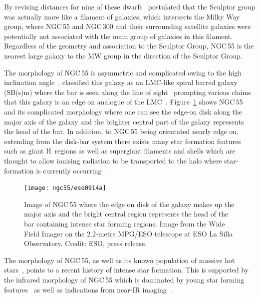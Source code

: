 By revising distances for nine of these dwarfs~\cite{2003A&A...404...93K} postulated that the Sculptor group was actually more like a filament of galaxies, which intersects the Milky Way group, where NGC\,55 and NGC\,300 and their surrounding satellite galaxies were potentially not associated with the main group of galaxies in this filament.
Regardless of the geometry and association to the Sculptor Group, NGC\,55 is the nearest large galaxy to the MW group in the direction of the Sculptor Group.

The morphology of NGC\,55 is asymmetric and complicated owing to the high inclination angle~\cite[up to 80\textdegree;][]{1986A&A...166...97H,2013MNRAS.434.3511W}.
\cite{1961ApJ...133..405D} classified this galaxy as an LMC-like spiral barred galaxy (SB(s)m) where the bar is seen along the line of sight~\cite{1961ApJ...133..405D}
prompting various claims that this galaxy is an edge on analogue of the LMC~\citep[e.g.][although not cited heavily -- two citations in 50 years -- the idea has propagated]{1964IAUS...20..276R}.
Figure~\ref{fig:ngc55-wide} shows NGC\,55 and its complicated morphology where one can see the edge-on disk along the major axis of the galaxy and the brighter central part of the galaxy represents the head of the bar.
In addition, to NGC\,55 being orientated nearly edge on, extending from the disk-bar system there exists many star formation features such as giant H\,\2 regions as well as supergiant filaments and shells which are thought to allow ionising radiation to be transported to the halo where star-formation is currently occurring~\citep{1996AJ....112.2567F}.

\begin{figure}
 \centering
 \texttt{[image: ngc55/eso0914a]}
 \caption[Image of NGC\,55]{Image of NGC\,55 where the edge on disk of the galaxy makes up the major axis and the bright central region represents the head of the bar containing intense star forming regions.
 Image from the Wide Field Imager on the 2.2-metre MPG/ESO telescope at ESO La Silla Observatory. Credit: ESO, press release.}
 \label{fig:ngc55-wide}
\end{figure}


The morphology of NGC\,55, as well as its known population of massive hot stars~\citep{2008A&A...485...41C,2012A&A...542A..79C}, points to a recent history of intense star formation.
This is supported by the infrared morphology of NGC\,55 which is dominated by young star forming features~\citep[][with a star formation rate of 0.22\,M$_{\odot}$yr$^{-1}$]{2004ApJS..154..248E} as well as indications from near-IR imaging~\citep{2005ApJ...622..279D}.


